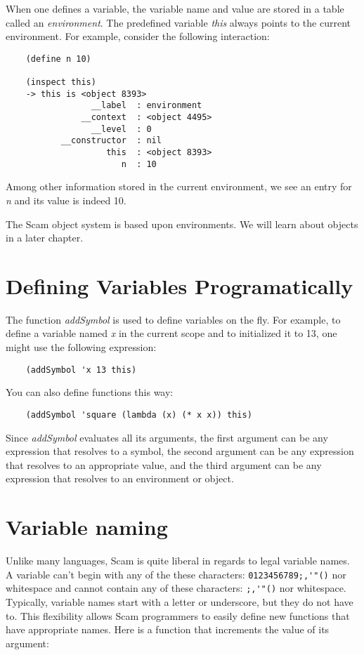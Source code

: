 When one defines a variable, the variable name and value are
stored in a table called an {\it environment}. The predefined
variable {\it this} always points to the current environment.
For example, consider the following interaction:

\begin{verbatim}
    (define n 10)

    (inspect this)
    -> this is <object 8393>
                 __label  : environment
               __context  : <object 4495>
                 __level  : 0
           __constructor  : nil
                    this  : <object 8393>
                       n  : 10
\end{verbatim}

Among other information stored in the current environment,
we see an entry for {\it n} and its value is indeed 10.

The Scam object system is based upon environments. We will
learn about objects in a later chapter.

\section{Defining Variables Programatically}

The function {\it addSymbol} is used to define variables on the 
fly. For example, to define a variable named {\it x} in the current
scope and to initialized it to 13, one might use the
following expression:

\begin{verbatim}
    (addSymbol 'x 13 this)
\end{verbatim}

You can also define functions this way:

\begin{verbatim}
    (addSymbol 'square (lambda (x) (* x x)) this)
\end{verbatim}

Since {\it addSymbol} evaluates all its arguments, the first
argument can be any expression that resolves to a symbol,
the second argument can be any expression that resolves
to an appropriate value, and the third argument can
be any expression that resolves to an environment or
object.


\section{Variable naming}

Unlike many languages,
Scam is quite liberal in regards to legal variable names.
A variable can't begin with any of the these characters:
\verb!0123456789;,'"()! nor whitespace and cannot contain any of these
characters: \verb!;,'"()! nor whitespace. Typically,
variable names start with a letter or underscore, but
they do not have to. This flexibility allows Scam programmers
to easily define new functions that have appropriate names.
Here is a function that increments the value of its argument:

